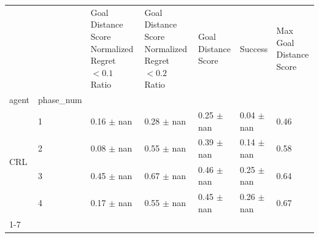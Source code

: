 \begin{tabular}{lllllll}
\toprule
 &  & Goal Distance Score Normalized Regret $< 0.1$ Ratio & Goal Distance Score Normalized Regret $< 0.2$ Ratio & Goal Distance Score & Success & Max Goal Distance Score \\
agent & phase_num &  &  &  &  &  \\
\midrule
\multirow[t]{4}{*}{CRL} & 1 & 0.16 $\pm$ nan & 0.28 $\pm$ nan & 0.25 $\pm$ nan & 0.04 $\pm$ nan & 0.46 \\
 & 2 & 0.08 $\pm$ nan & 0.55 $\pm$ nan & 0.39 $\pm$ nan & 0.14 $\pm$ nan & 0.58 \\
 & 3 & 0.45 $\pm$ nan & 0.67 $\pm$ nan & 0.46 $\pm$ nan & 0.25 $\pm$ nan & 0.64 \\
 & 4 & 0.17 $\pm$ nan & 0.55 $\pm$ nan & 0.45 $\pm$ nan & 0.26 $\pm$ nan & 0.67 \\
\cline{1-7}
\bottomrule
\end{tabular}
